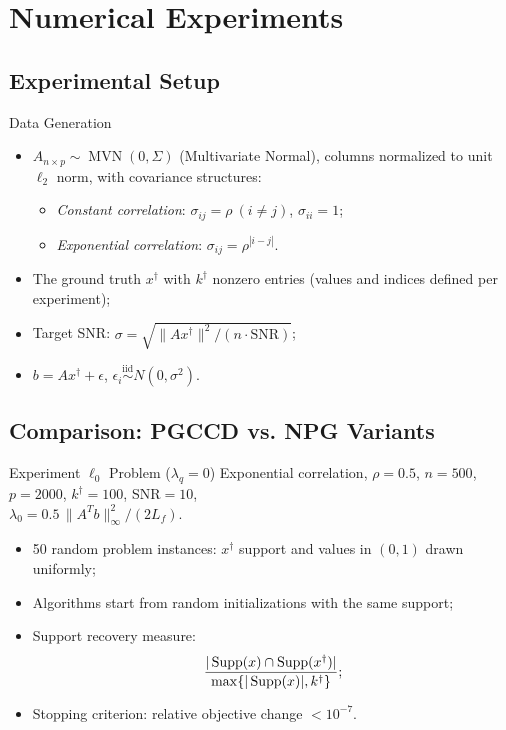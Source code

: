 \section{Numerical Experiments}

\subsection{Experimental Setup}
\begin{frame}{Data Generation}
\begin{itemize}
\item $A_{n\times p} \sim \operatorname{MVN}(0,\Sigma)$ (Multivariate Normal), columns normalized to unit $\ell_2$ norm, with covariance structures:
\begin{itemize}
\item \emph{Constant correlation}: $\sigma_{ij} = \rho\ (i\neq j)$, $\sigma_{ii}=1$;
\item \emph{Exponential correlation}: $\sigma_{ij} = \rho^{|i-j|}$.
\end{itemize}
\item The ground truth $x^\dagger$ with $k^\dagger$ nonzero entries (values and indices defined per experiment);
\item Target SNR: $\sigma = \sqrt{\|Ax^\dagger\|^2 / (n\cdot\text{SNR})}$;
\item $b = Ax^\dagger + \epsilon$, $\epsilon_i \stackrel{\text{iid}}{\sim} N(0,\sigma^2)$.
\end{itemize}
\end{frame}


\subsection{Comparison: PGCCD vs. NPG Variants}
\begin{frame}{Experiment $\ell_0$ Problem ($\lambda_q=0$)}
Exponential correlation, $\rho=0.5$, $n=500$, $p=2000$, $k^\dagger=100$, SNR$=10$,\\
$\lambda_0 = 0.5\,\|A^T b\|_\infty^2/(2 L_f)$.
\begin{itemize}
\item 50 random problem instances: $x^\dagger$ support and values in $(0,1)$ drawn uniformly;
\item Algorithms start from random initializations with the same support;
\item Support recovery measure:
\[
\frac{|\operatorname{Supp}(x) \cap \operatorname{Supp}(x^\dagger)|}{\max\{|\operatorname{Supp}(x)|, k^\dagger\}};
\]
\item Stopping criterion: relative objective change $< 10^{-7}$.
\end{itemize}
\end{frame}

